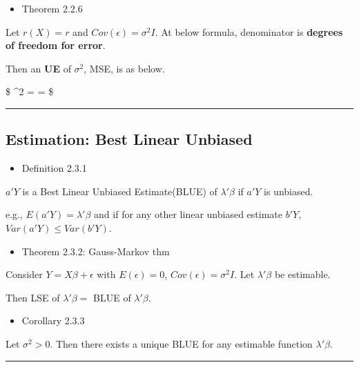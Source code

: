 \documentclass[
]{book}
\providecommand{\tightlist}{%
  \setlength{\itemsep}{0pt}\setlength{\parskip}{0pt}}
\begin{document}
{{{\begin{itemize}
\tightlist
\item
  Theorem 2.2.6
\end{itemize}

Let \(r (X) = r\) and \(Cov(\epsilon) = \sigma^2 I\). At below formula, denominator is \textbf{degrees of freedom for error}.

Then an \textbf{UE} of \(\sigma^2\), MSE, is as below.

\$
\hat \sigma\^{}2 = = 
\$

\begin{center}\rule{0.5\linewidth}{0.5pt}\end{center}

\hypertarget{estimation-best-linear-unbiased}{%
\subsection{Estimation: Best Linear Unbiased}\label{estimation-best-linear-unbiased}}

\begin{itemize}
\tightlist
\item
  Definition 2.3.1
\end{itemize}

\(a'Y\) is a Best Linear Unbiased Estimate(BLUE) of \(\lambda ' \beta\) if \(a ' Y\) is unbiased.

e.g., \(E(a ' Y) = \lambda ' \beta\) and if for any other linear unbiased estimate \(b ' Y\), \(Var(a ' Y) \le Var(b'Y)\).

\begin{itemize}
\tightlist
\item
  Theorem 2.3.2: Gauss-Markov thm
\end{itemize}

Consider \(Y = X \beta + \epsilon\) with \(E(\epsilon) = 0\), \(Cov(\epsilon) = \sigma^2 I\). Let \(\lambda ' \beta\) be estimable.

Then LSE of \(\lambda ' \beta=\) BLUE of \(\lambda ' \beta\).

\begin{itemize}
\tightlist
\item
  Corollary 2.3.3
\end{itemize}

Let \(\sigma^2 > 0\). Then there exists a unique BLUE for any estimable function \(\lambda ' \beta\).

\begin{center}\rule{0.5\linewidth}{0.5pt}\end{center}

}}}
\end{document}
